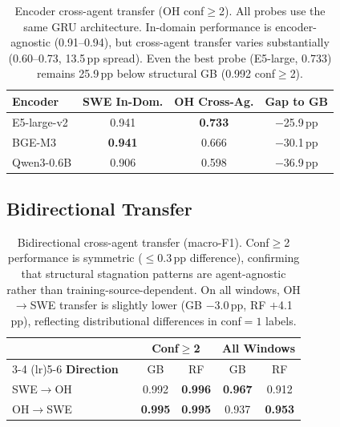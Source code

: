 \begin{table}[h]
\centering
\small
\begin{tabular}{lccc}
\toprule
\textbf{Encoder} & \textbf{SWE In-Dom.} & \textbf{OH Cross-Ag.} & \textbf{Gap to GB} \\
\midrule
E5-large-v2 & 0.941 & \textbf{0.733} & $-$25.9\,pp \\
BGE-M3 & \textbf{0.941} & 0.666 & $-$30.1\,pp \\
Qwen3-0.6B & 0.906 & 0.598 & $-$36.9\,pp \\
\bottomrule
\end{tabular}
\caption{Encoder cross-agent transfer (OH conf${\geq}$2). All probes use the same GRU architecture. In-domain performance is encoder-agnostic (0.91--0.94), but cross-agent transfer varies substantially (0.60--0.73, 13.5\,pp spread). Even the best probe (E5-large, 0.733) remains 25.9\,pp below structural GB (0.992 conf${\geq}$2).}
\label{tab:encoder_cross}
\end{table}

\subsection{Bidirectional Transfer}
\label{sec:app_reverse_transfer}

\begin{table}[h]
\centering
\small
\begin{tabular}{llcccc}
\toprule
& & \multicolumn{2}{c}{\textbf{Conf${\geq}$2}} & \multicolumn{2}{c}{\textbf{All Windows}} \\
\cmidrule(lr){3-4} \cmidrule(lr){5-6}
\textbf{Direction} & & GB & RF & GB & RF \\
\midrule
SWE$\to$OH & & 0.992 & \textbf{0.996} & \textbf{0.967} & 0.912 \\
OH$\to$SWE & & \textbf{0.995} & \textbf{0.995} & 0.937 & \textbf{0.953} \\
\bottomrule
\end{tabular}
\caption{Bidirectional cross-agent transfer (macro-F1). Conf${\geq}$2 performance is symmetric (${\leq}$0.3\,pp difference), confirming that structural stagnation patterns are agent-agnostic rather than training-source-dependent. On all windows, OH$\to$SWE transfer is slightly lower (GB $-$3.0\,pp, RF $+$4.1\,pp), reflecting distributional differences in conf${=}1$ labels.}
\label{tab:reverse_transfer}
\end{table}

